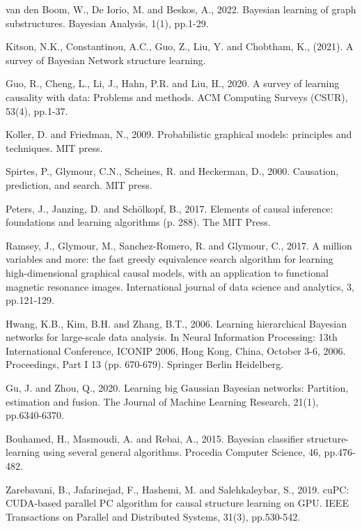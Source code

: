 \documentclass{article}
\begin{document}
\begin{thebibliography}{1}

\medskip
{
\small

van den Boom, W., De Iorio, M. and Beskos, A., 2022. Bayesian learning of graph substructures. Bayesian Analysis, 1(1), pp.1-29.

Kitson, N.K., Constantinou, A.C., Guo, Z., Liu, Y. and Chobtham, K., (2021). A survey of Bayesian Network structure learning.

Guo, R., Cheng, L., Li, J., Hahn, P.R. and Liu, H., 2020. A survey of learning causality with data: Problems and methods. ACM Computing Surveys (CSUR), 53(4), pp.1-37.

Koller, D. and Friedman, N., 2009. Probabilistic graphical models: principles and techniques. MIT press.

Spirtes, P., Glymour, C.N., Scheines, R. and Heckerman, D., 2000. Causation, prediction, and search. MIT press.

Peters, J., Janzing, D. and Schölkopf, B., 2017. Elements of causal inference: foundations and learning algorithms (p. 288). The MIT Press.

Ramsey, J., Glymour, M., Sanchez-Romero, R. and Glymour, C., 2017. A million variables and more: the fast greedy equivalence search algorithm for learning high-dimensional graphical causal models, with an application to functional magnetic resonance images. International journal of data science and analytics, 3, pp.121-129.

Hwang, K.B., Kim, B.H. and Zhang, B.T., 2006. Learning hierarchical Bayesian networks for large-scale data analysis. In Neural Information Processing: 13th International Conference, ICONIP 2006, Hong Kong, China, October 3-6, 2006. Proceedings, Part I 13 (pp. 670-679). Springer Berlin Heidelberg.

Gu, J. and Zhou, Q., 2020. Learning big Gaussian Bayesian networks: Partition, estimation and fusion. The Journal of Machine Learning Research, 21(1), pp.6340-6370.

Bouhamed, H., Masmoudi, A. and Rebai, A., 2015. Bayesian classifier structure-learning using several general algorithms. Procedia Computer Science, 46, pp.476-482.

Zarebavani, B., Jafarinejad, F., Hashemi, M. and Salehkaleybar, S., 2019. cuPC: CUDA-based parallel PC algorithm for causal structure learning on GPU. IEEE Transactions on Parallel and Distributed Systems, 31(3), pp.530-542.

}
\end{thebibliography}
\end{document}
